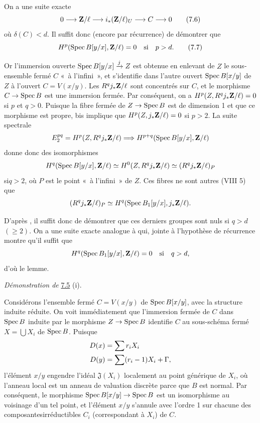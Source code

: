 \documentclass[10pt]{../fichiers-configuration-latex/smfart}
\begin{document}
On a une suite exacte
\begin{equation*}
0\longrightarrow \mathbf{Z}/\ell\longrightarrow
i_{\ast}(\mathbf{Z}/\ell)_{U}\longrightarrow C\longrightarrow 0\tag{7.6}
\end{equation*}
où $\delta(C)<d$. Il suffit donc (encore par récurrence) de démontrer
que
\begin{equation*}
H^{p}(\operatorname{Spec} B[y/x],\mathbf{Z}/\ell)=0\quad\text{\rm si}\quad
p>d{}.\tag{7.7}
\end{equation*}

Or l'immersion ouverte $\operatorname{Spec} B[y/x]\xrightarrow{j}Z$ est obtenue en
enlevant de $Z$ le sous-ensemble fermé $C$ « à l'infini », et
s'identifie dans l'autre ouvert $\operatorname{Spec} B[x/y]$ de $Z$ à l'ouvert
$C=V(x/y)$. Les $R^{q}j_{\ast}\mathbf{Z}/\ell$ sont concentrés sur
$C$, et le morphisme $C\rightarrow \operatorname{Spec} B$ est une immersion
fermée. Par conséquent, on a $H^{p}(Z,R^{q}j_{\ast}\mathbf{Z}/\ell)=0$
si $p$ et $q>0$. Puisque la fibre fermée de $Z\rightarrow \operatorname{Spec} B$ est
de dimension 1 et que ce morphisme est propre,  bis implique
que $H^{p}(Z,j_{\ast}\mathbf{Z}/\ell)=0$ si $p>2$. La suite spectrale
$$
E^{pq}_{2}=H^{p}(Z,R^{q}j_{\ast}\mathbf{Z}/\ell)\Longrightarrow
H^{p+q}(\operatorname{Spec} B[y/x],\mathbf{Z}/\ell)
$$
donne donc des isomorphismes
$$
H^{q}(\operatorname{Spec} B[y/x],\mathbf{Z}/\ell)\simeq
H^{0}(Z,R^{q}j_{\ast}\mathbf{Z}/\ell)\simeq
(R^{q}j_{\ast}\mathbf{Z}/\ell)_{P}
$$
si\pageoriginale $q>2$, où $P$ est le point « à l'infini » de
$Z$. Ces fibres ne sont autres (VIII 5) que
$$
(R^{q}j_{\ast}\mathbf{Z}/\ell)_{P}\simeq H^{q}(\operatorname{Spec}
B_{1}[y/x],j_{\ast}\mathbf{Z}/\ell){}.
$$

D'après , il suffit donc de démontrer que ces derniers groupes sont
nuls si $q>d$ $(\geq 2)$. On a une suite exacte analogue à  qui,
jointe à l'hypothèse de récurrence montre qu'il suffit que
$$
H^{q}(\operatorname{Spec} B_{1}[y/x],\mathbf{Z}/\ell)=0\quad\mbox{\rm si}\quad
q>d{},
$$
d'où le lemme.

\medskip
\noindent
\emph{Démonstration de} \hyperref[XIX.lem7.5]{7.5} (i).

Considérons l'ensemble fermé $C=V(x/y)$ de $\operatorname{Spec} B[x/y]$, avec la
structure induite réduite. On voit immédiatement que l'immersion
fermée de $C$ dans $\operatorname{Spec} B$ induite par le morphisme $Z\rightarrow
\operatorname{Spec} B$ identifie $C$ au sous-schéma fermé $X=\bigcup X_{i}$ de
$\operatorname{Spec} B$. Puisque
\begin{align*}
D(x) &= \sum r_{i}X_{i}\\
D(y) &= \sum (r_{i}-1)X_{i}+\Gamma{},
\end{align*}
l'élément $x/y$ engendre l'idéal $\mathfrak{J}(X_{i})$ localement au
point générique de $X_{i}$, où l'anneau local est un anneau de
valuation discrète parce que $B$ est normal. Par conséquent, le
morphisme $\operatorname{Spec} B[x/y]\rightarrow \operatorname{Spec} B$ est un isomorphisme au
voisinage d'un tel point, et l'élément $x/y$ s'annule avec l'ordre 1
sur chacune des composantes\pageoriginale irréductibles $C_{i}$
(correspondant à $X_{i}$) de $C$.
\end{document}
